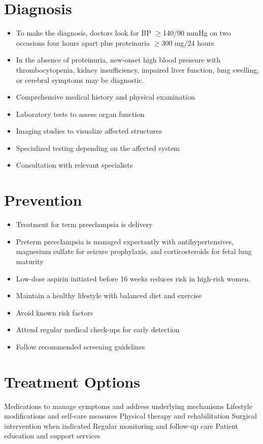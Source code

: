 \section{Diagnosis}
\begin{itemize}[noitemsep]
  \item To make the diagnosis, doctors look for BP $\ge$140/90 mmHg on two occasions four hours apart plus proteinuria $\ge$300 mg/24 hours
  \item In the absence of proteinuria, new-onset high blood pressure with thrombocytopenia, kidney insufficiency, impaired liver function, lung swelling, or cerebral symptoms may be diagnostic.
  \item Comprehensive medical history and physical examination
  \item Laboratory tests to assess organ function
  \item Imaging studies to visualize affected structures
  \item Specialized testing depending on the affected system
  \item Consultation with relevant specialists
\end{itemize}
\section{Prevention}
\begin{itemize}[noitemsep]
  \item Treatment for term preeclampsia is delivery
  \item Preterm preeclampsia is managed expectantly with antihypertensives, magnesium sulfate for seizure prophylaxis, and corticosteroids for fetal lung maturity
  \item Low-dose aspirin initiated before 16 weeks reduces risk in high-risk women.
  \item Maintain a healthy lifestyle with balanced diet and exercise
  \item Avoid known risk factors
  \item Attend regular medical check-ups for early detection
  \item Follow recommended screening guidelines
\end{itemize}
\section{Treatment Options}
Medications to manage symptoms and address underlying mechanisms Lifestyle modifications and self-care measures Physical therapy and rehabilitation Surgical intervention when indicated Regular monitoring and follow-up care Patient education and support services

